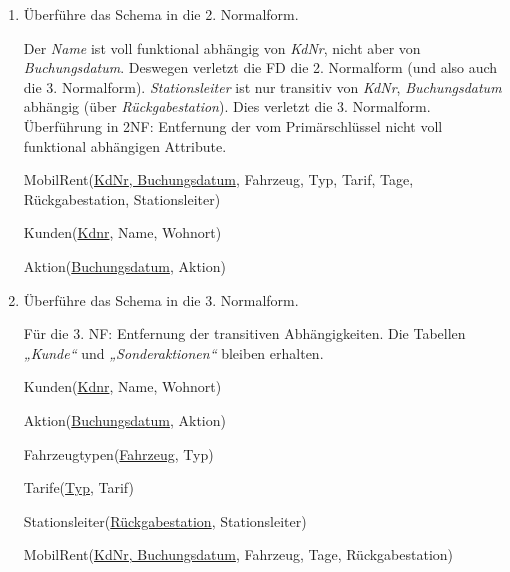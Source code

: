 \documentclass{bschlangaul-aufgabe}
\begin{document}
\begin{enumerate}

\item Überführe das Schema in die 2. Normalform.

\begin{bAntwort}
Der \emph{Name} ist voll funktional abhängig von \emph{KdNr}, nicht aber
von \emph{Buchungsdatum}. Deswegen verletzt die FD  die
2. Normalform (und also auch die 3. Normalform). \emph{Stationsleiter}
ist nur transitiv von \emph{KdNr}, \emph{Buchungsdatum} abhängig (über
\emph{Rückgabestation}). Dies verletzt die 3. Normalform. Überführung in
2NF: Entfernung der vom Primärschlüssel nicht voll funktional abhängigen
Attribute.

MobilRent(\underline{KdNr, Buchungsdatum}, Fahrzeug, Typ, Tarif, Tage,
Rückgabestation, Stationsleiter)

Kunden(\underline{Kdnr}, Name, Wohnort)

Aktion(\underline{Buchungsdatum}, Aktion)
\end{bAntwort}


\item Überführe das Schema in die 3. Normalform.

\begin{bAntwort}
Für die 3. NF: Entfernung der transitiven Abhängigkeiten. Die Tabellen
\emph{„Kunde“} und \emph{„Sonderaktionen“} bleiben erhalten.

Kunden(\underline{Kdnr}, Name, Wohnort)

Aktion(\underline{Buchungsdatum}, Aktion)

Fahrzeugtypen(\underline{Fahrzeug}, Typ)

Tarife(\underline{Typ}, Tarif)

Stationsleiter(\underline{Rückgabestation}, Stationsleiter)

MobilRent(\underline{KdNr, Buchungsdatum}, Fahrzeug, Tage, Rückgabestation)
\end{bAntwort}
\end{enumerate}
\end{document}
